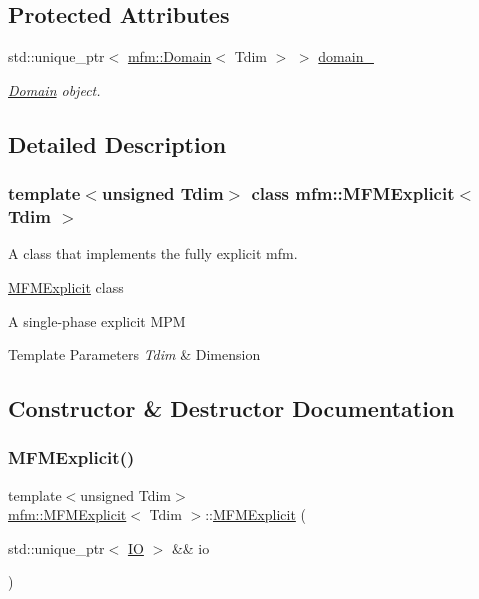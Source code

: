 \subsection*{Protected Attributes}
\begin{DoxyCompactItemize}
\item 
\mbox{\label{classmfm_1_1_m_f_m_explicit_a8ffcb7f9541221c76a9ab163bb7d574e}} 
std\+::unique\+\_\+ptr$<$ \hyperlink{classmfm_1_1_domain}{mfm\+::\+Domain}$<$ Tdim $>$ $>$ \hyperlink{classmfm_1_1_m_f_m_explicit_a8ffcb7f9541221c76a9ab163bb7d574e}{domain\+\_\+}
\begin{DoxyCompactList}\small\item\em \hyperlink{classmfm_1_1_domain}{Domain} object. \end{DoxyCompactList}\end{DoxyCompactItemize}


\subsection{Detailed Description}
\subsubsection*{template$<$unsigned Tdim$>$\newline
class mfm\+::\+M\+F\+M\+Explicit$<$ Tdim $>$}

A class that implements the fully explicit mfm. 

\hyperlink{classmfm_1_1_m_f_m_explicit}{M\+F\+M\+Explicit} class

A single-\/phase explicit M\+PM 
\begin{DoxyTemplParams}{Template Parameters}
{\em Tdim} & Dimension \\
\hline
\end{DoxyTemplParams}


\subsection{Constructor \& Destructor Documentation}
\mbox{\label{classmfm_1_1_m_f_m_explicit_a3b1473505cf73cd6c3589439d9216025}} 
\subsubsection{\texorpdfstring{M\+F\+M\+Explicit()}{MFMExplicit()}}
{\footnotesize\ttfamily template$<$unsigned Tdim$>$ \\
\hyperlink{classmfm_1_1_m_f_m_explicit}{mfm\+::\+M\+F\+M\+Explicit}$<$ Tdim $>$\+::\hyperlink{classmfm_1_1_m_f_m_explicit}{M\+F\+M\+Explicit} (\begin{DoxyParamCaption}\item[{std\+::unique\+\_\+ptr$<$ \hyperlink{classmfm_1_1_i_o}{IO} $>$ \&\&}]{io }\end{DoxyParamCaption})}



